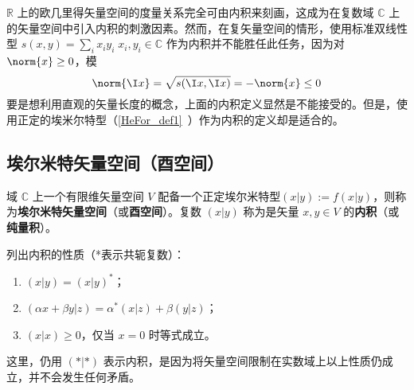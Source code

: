 
\begin{issues}
\issueTODO
\end{issues}

$\mathbb{R}$ 上的欧几里得矢量空间的度量关系完全可由内积来刻画，这成为在复数域 $\mathbb{C}$ 上的矢量空间中引入内积的刺激因素。然而，在复矢量空间的情形，使用标准双线性型 $s( x, y)=\sum_{i}x_iy_i\;x_i,y_i\in\mathbb{C}$ 作为内积并不能胜任此任务，因为对 $\norm{x}\geq0$，模
\begin{equation}
\norm{\I x}=\sqrt{s(\I x,\I x)}=-\norm{ x}\leq0
\end{equation}
要是想利用直观的矢量长度的概念，上面的内积定义显然是不能接受的。但是，使用正定的埃米尔特型（\autoref{HeFor_def1}~）作为内积的定义却是适合的。
\subsection{埃尔米特矢量空间（酉空间）}
\begin{definition}{}\label{HVorUV_def1}
域 $\mathbb{C}$ 上一个有限维矢量空间 $V$ 配备一个正定埃尔米特型$( x|  y):=f(  x|  y)$，则称为\textbf{埃尔米特矢量空间}（或\textbf{酉空间}）。复数 $(  x|  y)$ 称为是矢量 $  x,  y\in V$ 的\textbf{内积}（或\textbf{纯量积}）。
\end{definition}
列出内积的性质（*表示共轭复数）：
\begin{enumerate}
\item $(  x|  y)=(  x|  y)^*$；
\item $(\alpha  x+\beta  y|  z)=\alpha^*(  x|  z)+\beta(  y|  z)$；
\item $(  x|  x)\geq0$，仅当 $  x=  0$ 时等式成立。
\end{enumerate}

这里，仍用 $(*|*)$ 表示内积，是因为将矢量空间限制在实数域上以上性质仍成立，并不会发生任何矛盾。

